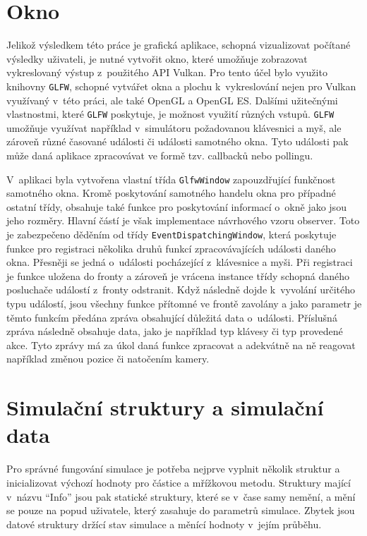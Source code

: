 \section{Okno}
\label{chapter:okno}
Jelikož výsledkem této práce je grafická aplikace, schopná vizualizovat počítané výsledky uživateli, je nutné vytvořit okno, které umožňuje zobrazovat vykreslovaný výstup z~použitého API Vulkan. Pro tento účel bylo využito knihovny \texttt{GLFW}, schopné vytvářet okna a plochu k~vykreslování nejen pro Vulkan využívaný v~této práci, ale také OpenGL a OpenGL ES. Dalšími užitečnými vlastnostmi, které \texttt{GLFW} poskytuje, je možnost využití různých vstupů. \texttt{GLFW} umožňuje využívat například v~simulátoru požadovanou klávesnici a myš, ale zároveň různé časované události či události samotného okna. Tyto události pak může daná aplikace zpracovávat ve formě tzv. callbacků nebo pollingu. 

V~aplikaci byla vytvořena vlastní třída \texttt{GlfwWindow} zapouzdřující funkčnost samotného okna. Kromě poskytování samotného handelu okna pro případné ostatní třídy, obsahuje také funkce pro poskytování informací o~okně jako jsou jeho rozměry. Hlavní částí je však implementace návrhového vzoru observer. Toto je zabezpečeno děděním od třídy \texttt{EventDispatchingWindow}, která poskytuje funkce pro registraci několika druhů funkcí zpracovávajících události daného okna. Přesněji se jedná o~události pocházející z~klávesnice a myši. Při registraci je funkce uložena do fronty a zároveň je vrácena instance třídy schopná daného posluchače událostí z~fronty odstranit. Když následně dojde k~vyvolání určitého typu událostí, jsou všechny funkce přítomné ve frontě zavolány a jako parametr je těmto funkcím předána zpráva obsahující důležitá data o~události. Příslušná zpráva následně obsahuje data, jako je například typ klávesy či typ provedené akce. Tyto zprávy má za úkol daná funkce zpracovat a adekvátně na ně reagovat například změnou pozice či natočením kamery.


\section{Simulační struktury a simulační data}
\label{chapter:simStructData}
Pro správné fungování simulace je potřeba nejprve vyplnit několik struktur a inicializovat výchozí hodnoty pro částice a mřížkovou metodu. Struktury mající v~názvu \enquote{Info} jsou pak statické struktury, které se v~čase samy nemění, a mění se pouze na popud uživatele, který zasahuje do parametrů simulace. Zbytek jsou datové struktury držící stav simulace a měnící hodnoty v~jejím průběhu.

